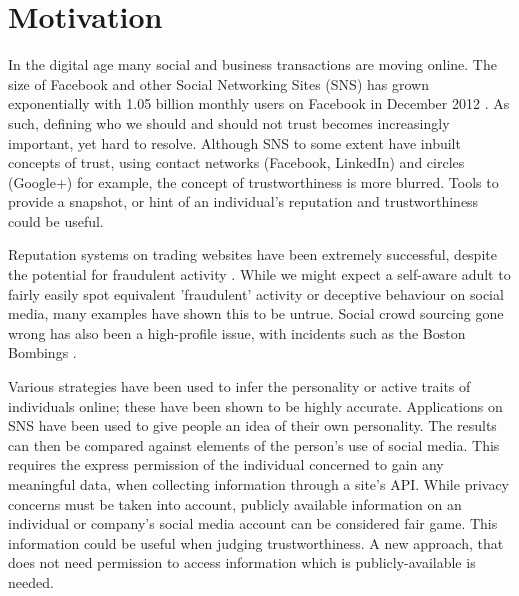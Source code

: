 



\section{Motivation}
In the digital age many social and business transactions are moving online. The size of Facebook and other Social Networking Sites (SNS) has grown exponentially with 1.05 billion monthly users on Facebook in December 2012 \cite{fb_users}. As such, defining who we should and should not trust becomes increasingly important, yet hard to resolve. Although SNS to some extent have inbuilt concepts of trust, using contact networks (Facebook, LinkedIn) and circles (Google+) for example, the concept of trustworthiness is more blurred. Tools to provide a snapshot, or hint of an individual's reputation and trustworthiness could be useful. 

Reputation systems on trading websites have been extremely successful, despite the potential for fraudulent activity \cite{resnick2002trust}. While we might expect a self-aware adult to fairly easily spot equivalent 'fraudulent' activity or deceptive behaviour on social media, many examples have shown this to be untrue. Social crowd sourcing gone wrong has also been a high-profile issue, with incidents such as the Boston Bombings \cite{crowdsourcing_wad,doan2011crowdsourcing,brabham2008crowdsourcing}.

Various strategies have been used to infer the personality or active traits of individuals online; these have been shown to be highly accurate. Applications on SNS have been used to give people an idea of their own personality. The results can then be compared against elements of the person's use of social media. This requires the express permission of the individual concerned to gain any meaningful data, when collecting information through a site's API. While privacy concerns must be taken into account, publicly available information on an individual or company's social media account can be considered fair game. This information could be useful when judging trustworthiness. A new approach, that does not need permission to access information which is publicly-available is needed. 

